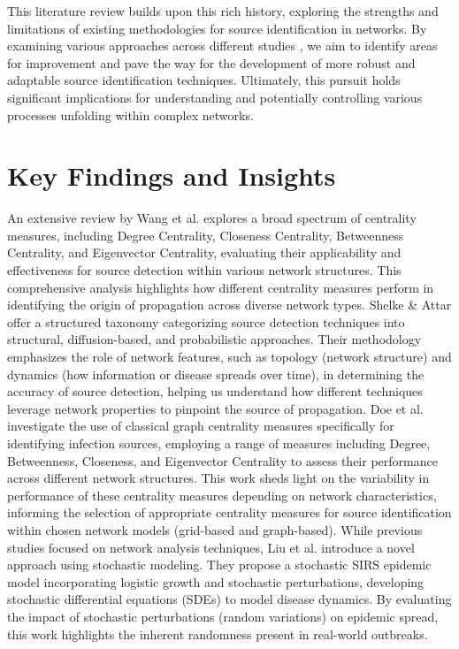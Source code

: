This literature review builds upon this rich history, exploring the strengths and limitations of existing methodologies for source identification in networks. By examining various approaches across different studies \cite{wang2020, shelke2019, doe2018, liu2020}, we aim to identify areas for improvement and pave the way for the development of more robust and adaptable source identification techniques. Ultimately, this pursuit holds significant implications for understanding and potentially controlling various processes unfolding within complex networks.

\section{Key Findings and Insights}
An extensive review by Wang et al. \cite{wang2020} explores a broad spectrum of centrality measures, including Degree Centrality, Closeness Centrality, Betweenness Centrality, and Eigenvector Centrality, evaluating their applicability and effectiveness for source detection within various network structures. This comprehensive analysis highlights how different centrality measures perform in identifying the origin of propagation across diverse network types. Shelke \& Attar \cite{shelke2019} offer a structured taxonomy categorizing source detection techniques into structural, diffusion-based, and probabilistic approaches. Their methodology emphasizes the role of network features, such as topology (network structure) and dynamics (how information or disease spreads over time), in determining the accuracy of source detection, helping us understand how different techniques leverage network properties to pinpoint the source of propagation.
Doe et al. \cite{doe2018} investigate the use of classical graph centrality measures specifically for identifying infection sources, employing a range of measures including Degree, Betweenness, Closeness, and Eigenvector Centrality to assess their performance across different network structures. This work sheds light on the variability in performance of these centrality measures depending on network characteristics, informing the selection of appropriate centrality measures for source identification within chosen network models (grid-based and graph-based).
While previous studies focused on network analysis techniques, Liu et al. \cite{liu2020} introduce a novel approach using stochastic modeling. They propose a stochastic SIRS epidemic model incorporating logistic growth and stochastic perturbations, developing stochastic differential equations (SDEs) to model disease dynamics. By evaluating the impact of stochastic perturbations (random variations) on epidemic spread, this work highlights the inherent randomness present in real-world outbreaks.

